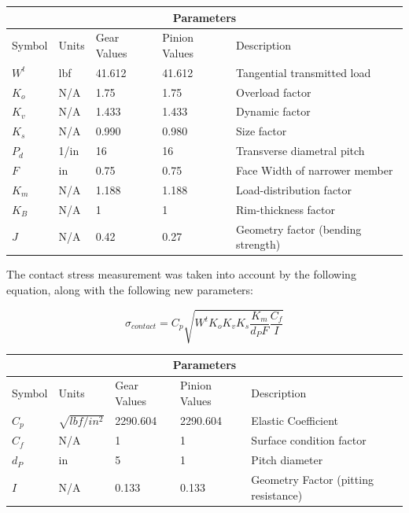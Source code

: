 \documentclass[letterpaper,12pt]{article}
\begin{document}
\begin{center}
	\begin{tabular}{ |p{2cm}||p{2cm}|p{2.3cm}|p{2.3cm}|p{6cm}|  }
		\hline
		\multicolumn{5}{|c|}{Parameters} \\
		\hline
		Symbol & Units & Gear Values & Pinion Values & Description\\
		\hline
		$W^t$ & lbf & 41.612 & 41.612 & Tangential transmitted load\\
		$K_o$ & N/A & 1.75 & 1.75 & Overload factor\\
		$K_v$ & N/A & 1.433 & 1.433 & Dynamic factor\\
		$K_s$ & N/A & 0.990 & 0.980 & Size factor\\
		$P_{d}$ & 1/in & 16 & 16 & Transverse diametral pitch\\
		$F$ & in & 0.75 & 0.75 & Face Width of narrower member\\
		$K_m$ & N/A & 1.188 & 1.188 & Load-distribution factor\\
		$K_{B}$ & N/A & 1 & 1 & Rim-thickness factor\\
		$J$ & N/A & 0.42 & 0.27 & Geometry factor (bending strength)\\
		\hline
	\end{tabular}
\end{center}

\noindent The contact stress measurement was taken into account by the following equation, along with the following new parameters:

\begin{equation}
\sigma_{contact} = C_{p}\sqrt{W^t K_o K_v K_s \frac{K_m}{d_P F}\frac{C_f}{I}}
\end{equation}

\begin{center}
	\begin{tabular}{ |p{2cm}||p{2cm}|p{2.3cm}|p{2.3cm}|p{6cm}|  }
		\hline
		\multicolumn{5}{|c|}{Parameters} \\
		\hline
		Symbol & Units & Gear Values & Pinion Values & Description\\
		\hline
		$C_p$ & $\sqrt{lbf/in^2}$ & 2290.604 & 2290.604 & Elastic Coefficient\\
		$C_f$ & N/A & 1 & 1 & Surface condition factor\\
		$d_P$ & in & 5 & 1 & Pitch diameter\\
		$I$ & N/A & 0.133 & 0.133 & Geometry Factor (pitting resistance)\\
		\hline
	\end{tabular}
\end{center}
\end{document}
